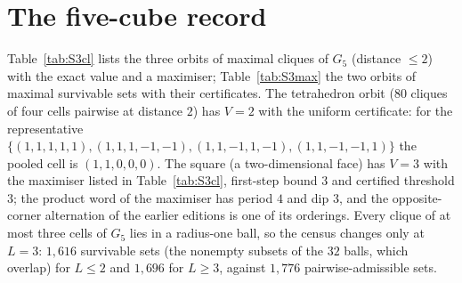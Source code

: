 \section{The five-cube record}\label{S:five}

Table~\ref{tab:S3cl} lists the three orbits of maximal cliques of $G_5$ (distance $\le2$) with the exact value and a maximiser; Table~\ref{tab:S3max} the two orbits of maximal survivable sets with their certificates. The tetrahedron orbit ($80$ cliques of four cells pairwise at distance $2$) has $V=2$ with the uniform certificate: for the representative $\{(1,1,1,1,1),(1,1,1,-1,-1),(1,1,-1,1,-1),(1,1,-1,-1,1)\}$ the pooled cell is $(1,1,0,0,0)$. The square (a two-dimensional face) has $V=3$ with the maximiser listed in Table~\ref{tab:S3cl}, first-step bound $3$ and certified threshold $3$; the product word of the maximiser has period $4$ and dip $3$, and the opposite-corner alternation of the earlier editions is one of its orderings. Every clique of at most three cells of $G_5$ lies in a radius-one ball, so the census changes only at $L=3$: $1{,}616$ survivable sets (the nonempty subsets of the $32$ balls, which overlap) for $L\le2$ and $1{,}696$ for $L\ge3$, against $1{,}776$ pairwise-admissible sets.
\begin{table}[H]\centering\small
\caption{Maximal cliques of $G_5$ by orbit.}\label{tab:S3cl}

\end{table}
\begin{table}[H]\centering\small
\caption{Five-cube maximal survivable orbits with certificates.}\label{tab:S3max}

\end{table}
